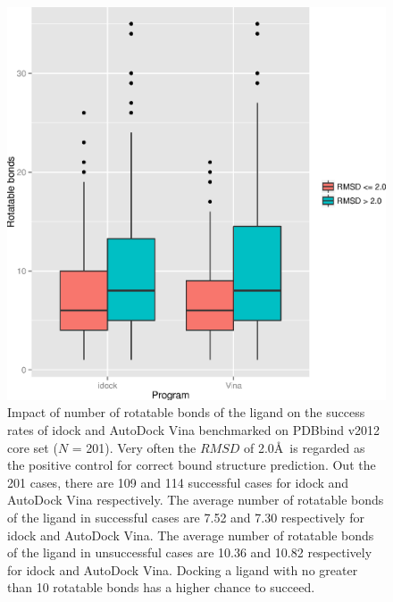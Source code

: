 \begin{figure}
\begin{center}
\includegraphics[width=\linewidth]{../istar/Program-NRB.eps}
\end{center}
\caption{Impact of number of rotatable bonds of the ligand on the success rates of idock and AutoDock Vina benchmarked on PDBbind v2012 core set ($N$ = 201). Very often the $RMSD$ of 2.0\AA\ is regarded as the positive control for correct bound structure prediction. Out the 201 cases, there are 109 and 114 successful cases for idock and AutoDock Vina respectively. The average number of rotatable bonds of the ligand in successful cases are 7.52 and 7.30 respectively for idock and AutoDock Vina. The average number of rotatable bonds of the ligand in unsuccessful cases are 10.36 and 10.82 respectively for idock and AutoDock Vina. Docking a ligand with no greater than 10 rotatable bonds has a higher chance to succeed.}
\label{istar:Program-NRB}
\end{figure}

